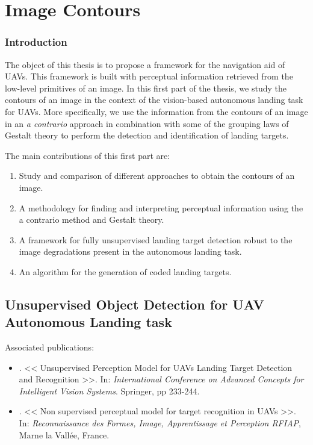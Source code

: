 \part{Image Contours}\label{part:image_contours}

\section*{Introduction}
The object of this thesis is to propose a framework for the navigation aid of UAVs. This framework is built with perceptual information retrieved from the low-level primitives of an image.
In this first part of the thesis, we study the contours of an image in the context of the vision-based autonomous landing task for UAVs. More specifically, we use the information from the contours of an image in an \textit{a contrario} approach in combination with some of the grouping laws of Gestalt theory to perform the detection and identification of landing targets.

The main contributions of this first part are:

\begin{enumerate}
	\item Study and comparison of different approaches to obtain the contours of an image.
	\item A methodology for finding and interpreting perceptual information using the a contrario method and Gestalt theory.
	\item A framework for fully unsupervised landing target detection robust to the image degradations present in the autonomous landing task.
	\item An algorithm for the generation of coded landing targets.
\end{enumerate}


\chapter{Unsupervised Object Detection for UAV Autonomous Landing task}

Associated publications: \vspace{-2mm}

\begin{itemize}
	\item \citep{Bazan.Dokladal.ea:ACIVS:2018}. << Unsupervised Perception Model for UAVs Landing Target Detection and Recognition >>. In: \textit{International Conference on Advanced Concepts for Intelligent Vision Systems}. Springer, pp 233-244.
	\item \citep{Bazan.Dokladal.ea:RFIAP:2018}. << Non supervised perceptual model for target recognition in UAVs >>. In: \textit{Reconnaissance des Formes, Image, Apprentissage et Perception RFIAP}, Marne la Vallée, France.
\end{itemize}

